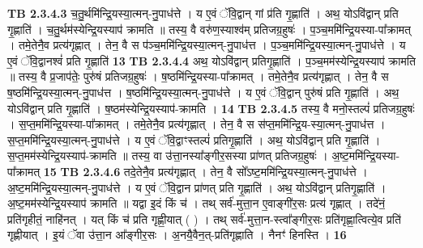\documentclass[17pt]{extarticle}
\begin{document}
                  \newline
                                \textbf{ TB 2.3.4.3} \newline
                  च॒तु॒र्थमि॑न्द्रि॒यस्या॒त्मन्-नु॒पाध॑त्ते । य ए॒वं ॅवि॒द्वान् गां प्र॑ति गृ॒ह्णाति॑ । अथ॒ योऽवि॑द्वान् प्रति गृ॒ह्णाति॑ । च॒तु॒र्थम॑स्येन्द्रि॒यस्याप॑ क्रामति ॥ तस्य॒ वै वरु॑ण॒स्याश्व॑म् प्रतिजग्र॒हुषः॑ । प॒ञ्च॒ममि॑न्द्रि॒यस्या-पा᳚क्रामत् । तमे॒तेनै॒व प्रत्य॑गृह्णात् । तेन॒ वै स प॑ञ्च॒ममि॑न्द्रि॒यस्या॒त्मन्-नु॒पाध॑त्त । प॒ञ्च॒ममि॑न्द्रि॒यस्या॒त्मन्-नु॒पाध॑त्ते । य ए॒वं ॅवि॒द्वानश्वं॑ प्रति गृ॒ह्णाति॑ \textbf{ 13} \newline
                  \newline
                                \textbf{ TB 2.3.4.4} \newline
                  अथ॒ योऽवि॑द्वान् प्रतिगृ॒ह्णाति॑ । प॒ञ्च॒मम॑स्येन्द्रि॒यस्याप॑ क्रामति ॥ तस्य॒ वै प्र॒जाप॑तेः॒ पुरु॑षं प्रतिजग्र॒हुषः॑ । ष॒ष्ठमि॑न्द्रि॒यस्या-पा᳚क्रामत् । तमे॒तेनै॒व प्रत्य॑गृह्णात् । तेन॒ वै स ष॒ष्ठमि॑न्द्रि॒यस्या॒त्मन्-नु॒पाध॑त्त । ष॒ष्ठमि॑न्द्रि॒यस्या॒त्मन्-नु॒पाध॑त्ते । य ए॒वं ॅवि॒द्वान् पुरु॑षं प्रति गृ॒ह्णाति॑ । अथ॒ योऽवि॑द्वान् प्रति गृ॒ह्णाति॑ । ष॒ष्ठम॑स्येन्द्रि॒यस्याप॑-क्रामति । \textbf{ 14} \newline
                  \newline
                                \textbf{ TB 2.3.4.5} \newline
                  तस्य॒ वै मनो॒स्तल्पं॑ प्रतिजग्र॒हुषः॑ । स॒प्त॒ममि॑न्द्रि॒यस्या-पा᳚क्रामत् । तमे॒तेनै॒व प्रत्य॑गृह्णात् । तेन॒ वै स स॑प्त॒ममि॑न्द्रि॒य-स्या॒त्मन्-नु॒पाध॑त्त । स॒प्त॒ममि॑न्द्रि॒यस्या॒त्मन्-नु॒पाध॑त्ते । य ए॒वं ॅवि॒द्वाꣳस्तल्पं॑ प्रतिगृ॒ह्णाति॑ । अथ॒ योऽवि॑द्वान् प्रति गृ॒ह्णाति॑ । स॒प्त॒मम॑स्येन्द्रि॒यस्याप॑-क्रामति ॥ तस्य॒ वा उ॑त्ता॒नस्या᳚ङ्गीर॒सस्या प्रा॑णत् प्रतिजग्र॒हुषः॑ । अ॒ष्ट॒ममि॑न्द्रि॒यस्या-पा᳚क्रामत् \textbf{ 15} \newline
                  \newline
                                \textbf{ TB 2.3.4.6} \newline
                  तदे॒तेनै॒व प्रत्य॑गृह्णात् । तेन॒ वै सो᳚ऽष्ट॒ममि॑न्द्रि॒यस्या॒त्मन्-नु॒पाध॑त्ते । अ॒ष्ट॒ममि॑न्द्रि॒यस्या॒त्मन्-नु॒पाध॑त्ते । य ए॒वं ॅवि॒द्वान प्रा॑णत् प्रति गृ॒ह्णाति॑ । अथ॒ योऽवि॑द्वान् प्रतिगृ॒ह्णाति॑ । अ॒ष्ट॒मम॑स्येन्द्रि॒यस्याप॑ क्रामति ॥ यद्वा इ॒दं किं च॑ । तथ् सर्व॑-मुत्ता॒न ए॒वाङ्गी॑र॒सः प्रत्य॑ गृह्णात् । तदे॑नं॒ प्रति॑गृहीतं॒ नाहि॑नत् । यत् किं च॑ प्रति गृह्णी॒यात् ( ) । तथ् सर्व॑-मुत्ता॒न-स्त्वा᳚ङ्गीर॒सः प्रति॑गृह्णा॒त्वित्ये॒व प्रति॑ गृह्णीयात् । इ॒यं ॅवा उ॑त्ता॒न आ᳚ङ्गीर॒सः । अ॒नयै॒वैन॒त्-प्रति॑गृह्णाति । नैनꣳ॑ हिनस्ति । \textbf{ 16} \newline
\end{document}
